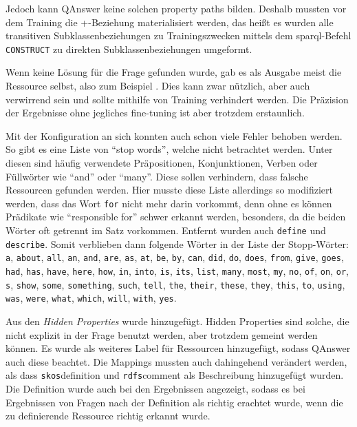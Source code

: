 Jedoch kann QAnswer keine solchen property paths bilden.
Deshalb mussten vor dem Training die +-Beziehung materialisiert werden,
das heißt es wurden alle transitiven Subklassenbeziehungen zu Trainingszwecken mittels dem \ac{sparql}-Befehl \texttt{CONSTRUCT} zu direkten Subklassenbeziehungen umgeformt.

Wenn keine Lösung für die Frage gefunden wurde, gab es als Ausgabe meist die Ressource selbst, also zum Beispiel .
Dies kann zwar nützlich, aber auch verwirrend sein und sollte mithilfe von Training verhindert werden.
Die Präzision der Ergebnisse ohne jegliches fine-tuning ist aber trotzdem erstaunlich.

Mit der Konfiguration an sich konnten auch schon viele Fehler behoben werden.
So gibt es eine Liste von \enquote{stop words}, welche nicht betrachtet werden.
Unter diesen sind häufig verwendete Präpositionen, Konjunktionen, Verben oder Füllwörter wie \enquote{and} oder \enquote{many}.
Diese sollen verhindern, dass falsche Ressourcen gefunden werden.
Hier musste diese Liste allerdings so modifiziert werden, dass das Wort \texttt{for} nicht mehr darin vorkommt, denn ohne es können Prädikate wie \enquote{responsible for} schwer erkannt werden,
besonders, da die beiden Wörter oft getrennt im Satz vorkommen.
Entfernt wurden auch \texttt{define} und \texttt{describe}.
Somit verblieben dann folgende Wörter in der Liste der Stopp-Wörter:
\texttt{a}, \texttt{about}, \texttt{all}, \texttt{an}, \texttt{and}, \texttt{are}, \texttt{as}, \texttt{at}, \texttt{be}, \texttt{by}, \texttt{can}, \texttt{did}, \texttt{do}, \texttt{does}, \texttt{from}, \texttt{give}, \texttt{goes}, \texttt{had}, \texttt{has}, \texttt{have}, \texttt{here}, \texttt{how}, \texttt{in}, \texttt{into}, \texttt{is}, \texttt{its}, \texttt{list}, \texttt{many}, \texttt{most}, \texttt{my}, \texttt{no}, \texttt{of}, \texttt{on}, \texttt{or}, \texttt{s}, \texttt{show}, \texttt{some}, \texttt{something}, \texttt{such}, \texttt{tell}, \texttt{the}, \texttt{their}, \texttt{these}, \texttt{they}, \texttt{this}, \texttt{to}, \texttt{using}, \texttt{was}, \texttt{were}, \texttt{what}, \texttt{which}, \texttt{will}, \texttt{with}, \texttt{yes}.

Aus den \emph{Hidden Properties} wurde  hinzugefügt.
Hidden Properties sind solche, die nicht explizit in der Frage benutzt werden, aber trotzdem gemeint werden können.
Es wurde  als weiteres Label für Ressourcen hinzugefügt, sodass QAnswer auch diese beachtet.
Die Mappings mussten auch dahingehend verändert werden, als dass \texttt{skos}{definition}
und \texttt{rdfs}{comment} als Beschreibung hinzugefügt wurden.
Die Definition wurde auch bei den Ergebnissen angezeigt, sodass es bei Ergebnissen von Fragen nach der Definition als richtig erachtet wurde, wenn die zu definierende Ressource richtig erkannt wurde.

